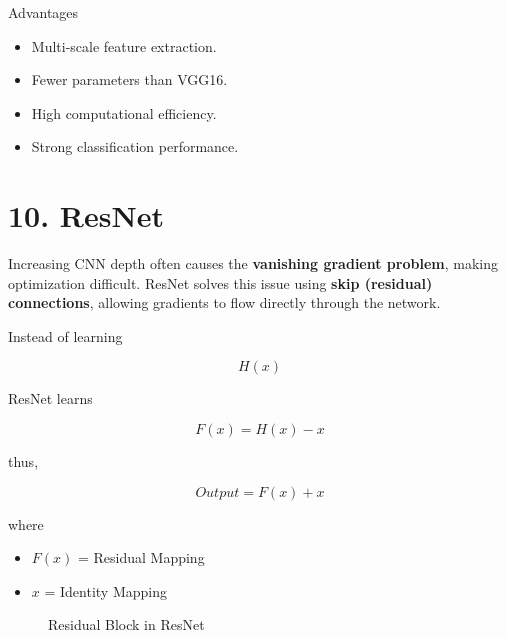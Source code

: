\documentclass[11pt]{article}
\begin{document}
Advantages

\begin{itemize}
\item Multi-scale feature extraction.
\item Fewer parameters than VGG16.
\item High computational efficiency.
\item Strong classification performance.
\end{itemize}


\section*{10. ResNet}

Increasing CNN depth often causes the \textbf{vanishing gradient problem},
making optimization difficult. ResNet solves this issue using
\textbf{skip (residual) connections}, allowing gradients to flow directly
through the network.

Instead of learning

\[
H(x)
\]

ResNet learns

\[
F(x)=H(x)-x
\]

thus,

\[
Output = F(x)+x
\]

where

\begin{itemize}
\item $F(x)$ = Residual Mapping
\item $x$ = Identity Mapping
\end{itemize}

\begin{figure}[H]
\centering


\caption{Residual Block in ResNet}
\end{figure}
\end{document}
